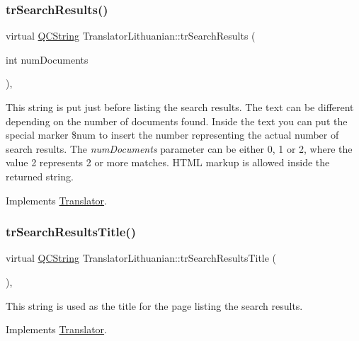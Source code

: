 \subsubsection{\texorpdfstring{trSearchResults()}{trSearchResults()}}
{\footnotesize\ttfamily virtual \mbox{\hyperlink{class_q_c_string}{Q\+C\+String}} Translator\+Lithuanian\+::tr\+Search\+Results (\begin{DoxyParamCaption}\item[{int}]{num\+Documents }\end{DoxyParamCaption})\hspace{0.3cm}{\ttfamily [inline]}, {\ttfamily [virtual]}}

This string is put just before listing the search results. The text can be different depending on the number of documents found. Inside the text you can put the special marker \$num to insert the number representing the actual number of search results. The {\itshape num\+Documents} parameter can be either 0, 1 or 2, where the value 2 represents 2 or more matches. H\+T\+ML markup is allowed inside the returned string. 

Implements \mbox{\hyperlink{class_translator}{Translator}}.

\mbox{\label{class_translator_lithuanian_a485edc71d11d7b1277de40763a2f6622}} 
\subsubsection{\texorpdfstring{trSearchResultsTitle()}{trSearchResultsTitle()}}
{\footnotesize\ttfamily virtual \mbox{\hyperlink{class_q_c_string}{Q\+C\+String}} Translator\+Lithuanian\+::tr\+Search\+Results\+Title (\begin{DoxyParamCaption}{ }\end{DoxyParamCaption})\hspace{0.3cm}{\ttfamily [inline]}, {\ttfamily [virtual]}}

This string is used as the title for the page listing the search results. 

Implements \mbox{\hyperlink{class_translator}{Translator}}.

\mbox{\label{class_translator_lithuanian_a9a88362a262a6b287ab7a194eea170c0}} 
